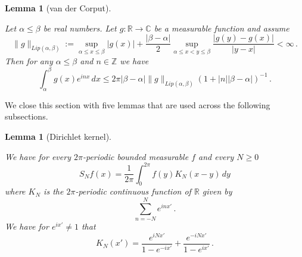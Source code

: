 \documentclass[10pt,a4paper]{article}
\theoremstyle{plain}
\newtheorem{lemma}[theorem]{Lemma}
\theoremstyle{definition}
\numberwithin{equation}{subsection}
\newcommand{\Z}{{\mathbb{Z}}}
\newcommand{\R}{{\mathbb{R}}}
\newcommand{\lean}[1]{}
\newcommand{\leanok}{}
\def\C{\mathbb{C}}
\begin{document}
\begin{lemma}[van der Corput]
\label{van-der-Corput}
\leanok
\lean{van_der_Corput}
    Let $\alpha\le\beta$ be real numbers. Let $g:\R\to \C$ be a measurable function and assume
    \begin{equation}
        \|g\|_{Lip(\alpha,\beta)}:=\sup_{\alpha\le x\le \beta}|g(x)|+\frac{|\beta-\alpha|}{2}
        \sup_{\alpha\le x<y\le \beta} \frac {|g(y)-g(x)|}{|y-x|}<\infty\, .
    \end{equation}
    Then for any $\alpha \le \beta$ and $n\in\Z$ we have
    \begin{equation}
        \int _{\alpha}^{\beta} g(x) e^{inx}\, dx\le 2\pi |\beta-\alpha|\|g\|_{Lip(\alpha,\beta)}(1+|n||\beta-\alpha|)^{-1}\, .
    \end{equation}

\end{lemma}


We close this section with five lemmas that are used
across the following subsections.

\begin{lemma}[Dirichlet kernel]
\label{Dirichlet-kernel}
\leanok
\lean{dirichletKernel_eq, partialFourierSum_eq_conv_dirichletKernel}
We have for every $2\pi$-periodic bounded measurable $f$ and every $N\ge 0$
\begin{equation}
    S_Nf(x)=\frac 1{2\pi}\int_{0}^{2\pi}f(y) K_N(x-y)\, dy
\end{equation}
where $K_N$ is the $2\pi$-periodic continuous function of
$\R$ given by
\begin{equation}\label{eqksumexp}
\sum_{n=-N}^N e^{in x'}\, .
\end{equation}
We have for $e^{ix'}\neq 1$ that
\begin{equation}\label{eqksumhil}
    K_N(x')=\frac{e^{iNx'}}{1-e^{-ix'}}
      +\frac {e^{-iNx'}}{1-e^{ix'}} \, .
\end{equation}


\end{lemma}
\end{document}
